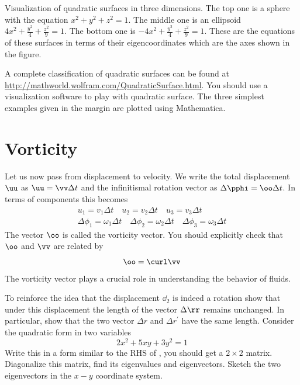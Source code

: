 \begin{marginfigure}
 \caption{ Visualization of quadratic surfaces in three
   dimensions. The top one is a sphere with the equation
  $x^2+y^2+z^2=1$. The middle one is an ellipsoid 
  $4x^2+\frac{y^2}{4}+\frac{z^2}{9}=1$. The bottom one is
 $-4x^2+\frac{y^2}{4}+\frac{z^2}{9}=1$. These are the equations of
 these surfaces in terms of their eigencoordinates which are the axes
 shown in the figure. }
  \label{fig:qsurf}
\end{marginfigure}
%
A complete classification of quadratic surfaces can be found at 
\url{http://mathworld.wolfram.com/QuadraticSurface.html}. You should
use a visualization software  to play with quadratic
surface. The three simplest examples given in the margin are plotted
using Mathematica.
\section{Vorticity}
Let us now pass from displacement to velocity. We write the total
displacement $\uu$  as $\uu = \vv \Delta t$ and the infinitismal
rotation vector as $\Delta \pphi = \oo \Delta t$. In terms of
components this becomes 
\begin{subequations}
\begin{align}
u_1 = v_1 \Delta t \quad u_2 = v_2 \Delta t \quad u_3 = v_3 \Delta t
  \\
\Delta \phi_1 = \omega_1 \Delta t \quad \Delta \phi_2 =
  \omega_2 \Delta t\quad
  \Delta \phi_3 = \omega_3 \Delta t 
\end{align}
\end{subequations}
The vector $\oo$ is called the vorticity vector. You should
explicitly check that $\oo$ and  $\vv$ are related by  
\begin{equation}
\oo = \curl \vv
\end{equation}
The vorticity vector plays a crucial role in understanding the
behavior of fluids. 
\begin{Exercise}
\Question
To reinforce the idea that the displacement $\dd_2$ is indeed a
rotation show that under this displacement the length of the vector
$\Delta \rr$ remains unchanged. In particular, show that the two
vector $\Delta r$ and $\Delta r^{\prime}$ have the same length. 
\Question Consider the quadratic form in two variables
\begin{equation}
2x^2 + 5xy+ 3y^2 = 1
\end{equation}
Write this in a form similar to the RHS of , you
should get a $2\times 2$ matrix. Diagonalize this matrix, find its
eigenvalues and eigenvectors. Sketch the two eigenvectors in the $x-y$
coordinate system. 
\end{Exercise}
